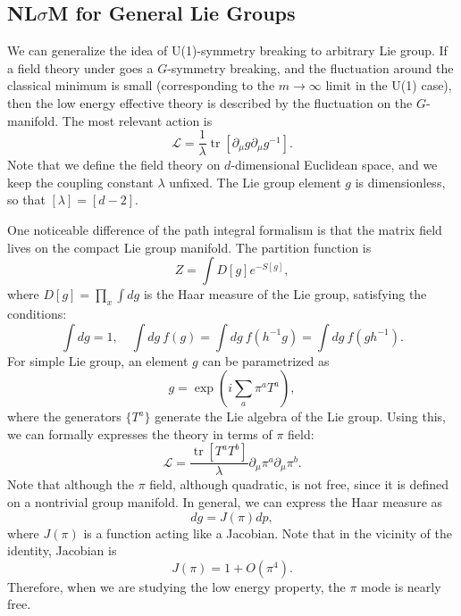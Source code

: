 \documentclass[aps,prb,superscriptaddress,nofootinbib]{revtex4}
\def \tr{\operatorname{tr}}
\begin{document}
\subsection{NL$\sigma$M for General Lie Groups}

We can generalize the idea of U(1)-symmetry breaking to arbitrary Lie group.
If a field theory under goes a $G$-symmetry breaking, and the fluctuation around the classical minimum is small (corresponding to the $m\rightarrow\infty$ limit in the U(1) case), then the low energy effective theory is described by the fluctuation on the $G$-manifold.
The most relevant action is 
\begin{equation}
	\mathcal L = \frac{1}{\lambda} \tr\left[\partial_\mu g \partial_\mu g^{-1}\right].
\end{equation}
Note that we define the field theory on $d$-dimensional Euclidean space, and we keep the coupling constant $\lambda$ unfixed.
The Lie group element $g$ is dimensionless, so that $[\lambda] = [d-2]$.

One noticeable difference of the path integral formalism is that the matrix field lives on the compact Lie group manifold.
The partition function is
\begin{equation}
	Z = \int D[g] e^{-S[g]},
\end{equation}
where $D[g]=\prod_x \int dg$ is the Haar measure of the Lie group, satisfying the conditions:
\begin{equation}
	\int dg = 1,\quad
	\int dg\ f(g) = \int dg\ f(h^{-1} g) = \int dg\ f(gh^{-1}).
\end{equation}
For simple Lie group, an element $g$ can be parametrized as
\begin{equation}
	g = \exp\left(i\sum_a \pi^a T^a\right),
\end{equation}
where the generators $\{T^a\}$ generate the Lie algebra of the Lie group.
Using this, we can formally expresses the theory in terms of $\pi$ field:
\begin{equation}
	\mathcal L = \frac{\tr[T^a T^b]}{\lambda}\partial_\mu\pi^a \partial_\mu \pi^b.
\end{equation}
Note that although the $\pi$ field, although quadratic, is not free, since it is defined on a nontrivial group manifold.
In general, we can express the Haar measure as
\begin{equation}
	dg = J(\pi) dp,
\end{equation}
where $J(\pi)$ is a function acting like a Jacobian. 
Note that in the vicinity of the identity, Jacobian is
\begin{equation}
	J(\pi) = 1 +O(\pi^4).
\end{equation}
Therefore, when we are studying the low energy property, the $\pi$ mode is nearly free.
\end{document}

